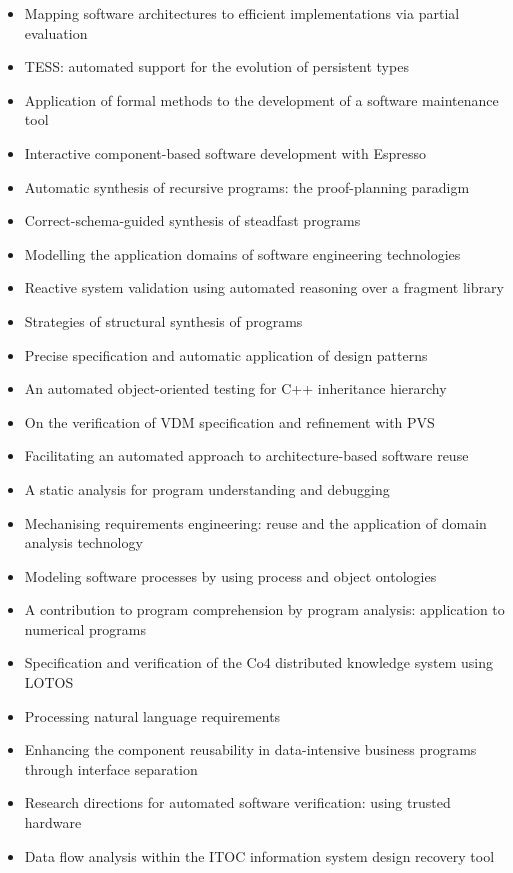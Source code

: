 {\small
\begin{itemize}[itemsep=-1ex]
  \item Mapping software architectures to efficient implementations via partial evaluation
  \item TESS: automated support for the evolution of persistent types
  \item Application of formal methods to the development of a software maintenance tool
  \item Interactive component-based software development with Espresso
  \item Automatic synthesis of recursive programs: the proof-planning paradigm
  \item Correct-schema-guided synthesis of steadfast programs
  \item Modelling the application domains of software engineering technologies
  \item Reactive system validation using automated reasoning over a fragment library
  \item Strategies of structural synthesis of programs
  \item Precise specification and automatic application of design patterns
  \item An automated object-oriented testing for C++ inheritance hierarchy
  \item On the verification of VDM specification and refinement with PVS
  \item Facilitating an automated approach to architecture-based software reuse
  \item A static analysis for program understanding and debugging
  \item Mechanising requirements engineering: reuse and the application of domain analysis technology
  \item Modeling software processes by using process and object ontologies
  \item A contribution to program comprehension by program analysis: application to numerical programs
  \item Specification and verification of the Co4 distributed knowledge system using LOTOS
  \item Processing natural language requirements
  \item Enhancing the component reusability in data-intensive business programs through interface separation
  \item Research directions for automated software verification: using trusted hardware
  \item Data flow analysis within the ITOC information system design recovery tool

\end{itemize}}
